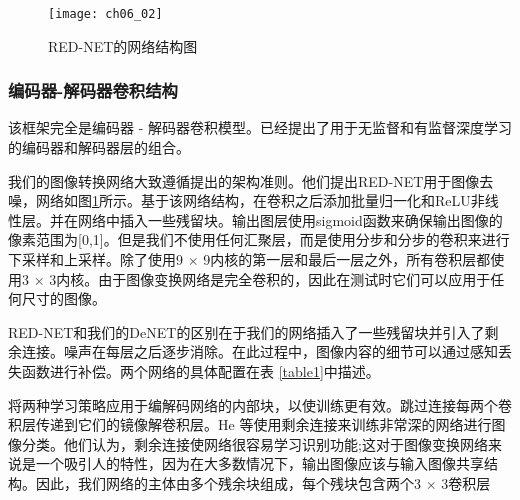 \begin{figure}[t]
\centering
\texttt{[image: ch06\_02]}
\caption{ RED-NET的网络结构图}
\label{fig:ch06_02}
\vspace{-6mm}
\end{figure} 
\subsubsection{编码器-解码器卷积结构}

该框架完全是编码器 - 解码器卷积模型。已经提出了用于无监督和有监督深度学习的编码器和解码器层的组合\cite{NohH2015,hong2015decoupled,Long2017Fully,Dong2016,Mao2016}。

我们的图像转换网络大致遵循\cite{Mao2016}提出的架构准则。他们提出RED-NET用于图像去噪，网络如图\ref{fig:ch06_02}所示。基于该网络结构，在卷积之后添加批量归一化\cite{Ioffe2014Batch}和ReLU非线性层。并在网络中插入一些残留块\cite{he15}。输出图层使用sigmoid函数来确保输出图像的像素范围为[0,1]。但是我们不使用任何汇聚层，而是使用分步和分步的卷积来进行下采样和上采样。除了使用9 $ \times $ 9内核的第一层和最后一层之外，所有卷积层都使用3 $ \times $ 3内核。由于图像变换网络是完全卷积的，因此在测试时它们可以应用于任何尺寸的图像。

RED-NET和我们的DeNET的区别在于我们的网络插入了一些残留块并引入了剩余连接。噪声在每层之后逐步消除。在此过程中，图像内容的细节可以通过感知丢失函数进行补偿。两个网络的具体配置在表 \ref{table1}中描述。

将两种学习策略应用于编解码网络的内部块，以使训练更有效。跳过连接每两个卷积层传递到它们的镜像解卷积层。He 等\cite{he15}使用剩余连接来训练非常深的网络进行图像分类。他们认为，剩余连接使网络很容易学习识别功能;这对于图像变换网络来说是一个吸引人的特性，因为在大多数情况下，输出图像应该与输入图像共享结构。因此，我们网络的主体由多个残余块组成，每个残块包含两个3 $ \times $ 3卷积层
 
